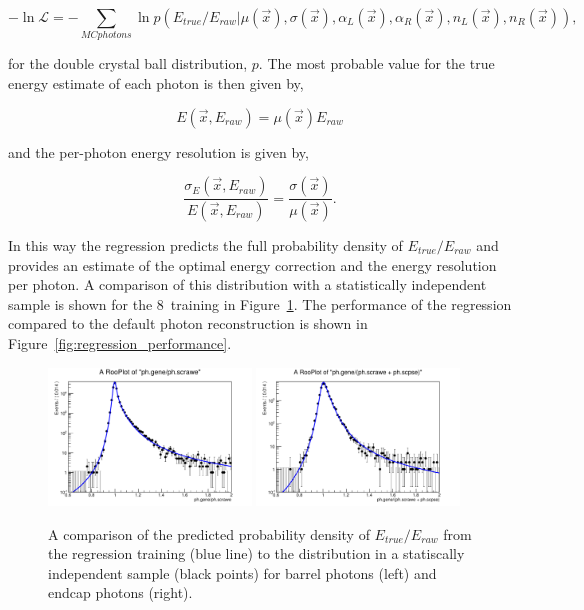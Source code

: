 \begin{equation}
  -\ln \mathcal{L} = - \sum_{MC photons} \ln p(E_{true}/E_{raw} | \mu(\vec{x}),\sigma(\vec{x}),\alpha_{L}(\vec{x}),\alpha_{R}(\vec{x}),n_{L}(\vec{x}),n_{R}(\vec{x})),
\end{equation}

for the double crystal ball distribution, $p$. The most probable value for the true energy estimate of each photon is then given by,

\begin{equation}
  E(\vec{x},E_{raw}) = \mu(\vec{x})E_{raw}
\end{equation}

and the per-photon energy resolution is given by, 

\begin{equation}
  \frac{\sigma_{E}(\vec{x},E_{raw})}{E(\vec{x},E_{raw})} = \frac{\sigma(\vec{x})}{\mu(\vec{x})}.
\end{equation}

In this way the regression predicts the full probability density of $E_{true}/E_{raw}$ and provides an estimate of the optimal energy correction and the energy resolution per photon. A comparison of this distribution with a statistically independent \MC sample is shown for the 8~\TeV training in Figure~\ref{fig:regression_training}. The performance of the regression compared to the default photon reconstruction is shown in Figure~\ref{fig:regression_performance}.

\begin{figure}
  \includegraphics[width=0.48\textwidth]{ch3_comm_anal_comps/plots/regression_barrel.pdf}
  \includegraphics[width=0.48\textwidth]{ch3_comm_anal_comps/plots/regression_endcap.pdf}
  \caption{A comparison of the predicted probability density of $E_{true}/E_{raw}$ from the regression training (blue line) to the distribution in a statiscally independent \MC sample (black points) for barrel photons (left) and endcap photons (right). }
  \label{fig:regression_training}
\end{figure}

